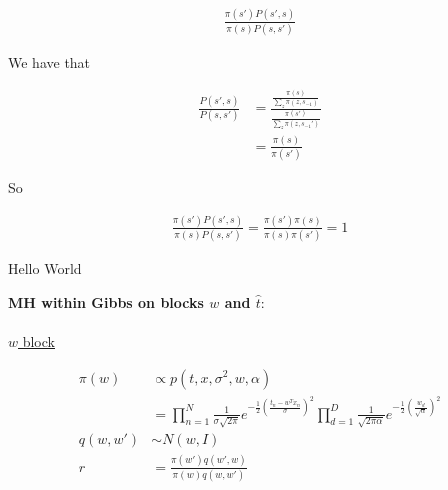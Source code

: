 \documentclass[10pt]{homeworg}
\begin{document}
\begin{align*}
\frac{\pi(s')P(s',s)}{\pi(s)P(s,s')}
\end{align*}

We have that

\begin{align*}
\frac{P(s',s)}{P(s,s')} &= \frac{\frac{\pi(s)}{\sum_z \pi(z,s_{-1})}}{\frac{\pi(s')}{\sum_z \pi(z, s_{-1}')}}\\
					   &= \frac{\pi(s)}{\pi(s')}
\end{align*}

So

\begin{align*}
\frac{\pi(s')P(s',s)}{\pi(s)P(s,s')} = \frac{\pi(s')\pi(s)}{\pi(s)\pi(s')} = 1
\end{align*}


\exercise
Hello World


\exercise 
\textbf{MH within Gibbs on blocks $w$ and $\hat{t}$}:\\
\\
\underline{$w$ block}

\begin{align*}
\pi(w) &\propto p(t,x,\sigma^2,w,\alpha)\\
	   &= \prod_{n=1}^N \frac{1}{\sigma\sqrt{2\pi}}e^{-\frac{1}{2}(\frac{t_n-w^Tx_n}{\sigma})^2}\prod_{d=1}^D \frac{1}{\sqrt{2\pi\alpha}}e^{-\frac{1}{2}(\frac{w_d}{\sqrt{\alpha}})^2}
\\
q(w,w') &\sim N(w,I)
\\
r &= \frac{\pi(w')q(w',w)}{\pi(w)q(w,w')}
\end{align*}
\end{document}
